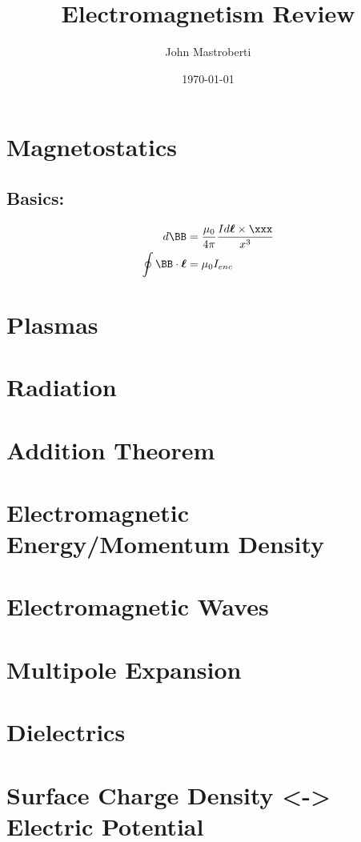 \documentclass[11pt]{article}
\author{John Mastroberti}
\date{\today}
\title{Electromagnetism Review}
\begin{document}
\maketitle
\tableofcontents

\usepackage{jm}

\section{Magnetostatics}
\label{sec:org315f5f4}
\subsection{Basics:}
\label{sec:org0467057}
\begin{align*}
d\BB & = \frac{\mu_0}{4\pi} \frac{I d\boldsymbol{\ell} \times \xxx}{x^3} \\
\oint \BB \cdot \boldsymbol{\ell} & = \mu_0 I_{enc} \\
\end{align*}
\section{Plasmas}
\label{sec:org8ab0b4d}
\section{Radiation}
\label{sec:orga5c8d87}
\section{Addition Theorem}
\label{sec:org7a56632}
\section{Electromagnetic Energy/Momentum Density}
\label{sec:org6879d4a}
\section{Electromagnetic Waves}
\label{sec:org4acd887}
\section{Multipole Expansion}
\label{sec:org8ad3577}
\section{Dielectrics}
\label{sec:orgc6a03c5}
\section{Surface Charge Density <-> Electric Potential}
\label{sec:org3e75aa2}
\end{document}
